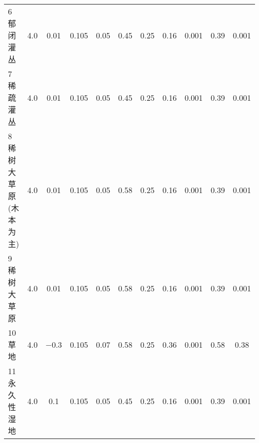 \begin{landscape}
\begin{table}[htbp]
\begin{tabular}{@{}lcccccccccc@{}}
      6 郁闭灌丛              & 4.0              & \num { 0.01 }         & 0.105                    & 0.05                     & 0.45                     & 0.25                     & 0.16                     & 0.001                    & 0.39                     & 0.001                    \\
      7 稀疏灌丛              & 4.0              & \num { 0.01 }         & 0.105                    & 0.05                     & 0.45                     & 0.25                     & 0.16                     & 0.001                    & 0.39                     & 0.001                    \\
      8 稀树大草原(木本为主)  & 4.0              & \num { 0.01 }         & 0.105                    & 0.05                     & 0.58                     & 0.25                     & 0.16                     & 0.001                    & 0.39                     & 0.001                    \\
      9 稀树大草原            & 4.0              & \num {  0.01 }        & 0.105                    & 0.05                     & 0.58                     & 0.25                     & 0.16                     & 0.001                    & 0.39                     & 0.001                    \\
      10 草地                 & 4.0              & \num{ -0.3}           & 0.105                    & 0.07                     & 0.58                     & 0.25                     & 0.36                     & 0.001                    & 0.58                     & 0.38                     \\
      11 永久性湿地           & 4.0              & \num {0.1 }           & 0.105                    & 0.05                     & 0.45                     & 0.25                     & 0.16                     & 0.001                    & 0.39                     & 0.001                    \\ %
%

\end{tabular}
\end{table}
\end{landscape}
